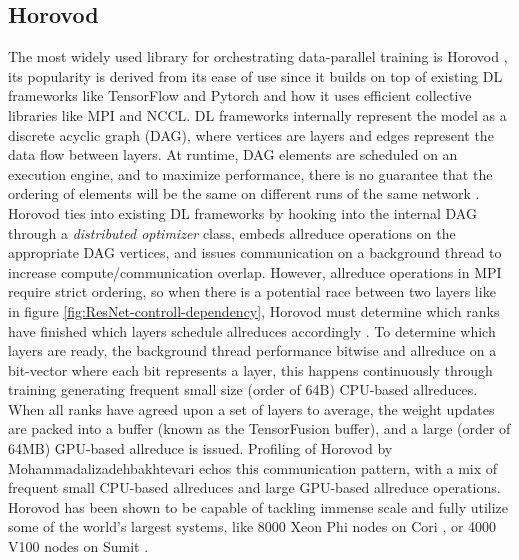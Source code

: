 \subsection{Horovod}\label{sec:CH3-horovod}
The most widely used library for orchestrating data-parallel training is Horovod \cite{Sergeev2018Horovod}, its popularity is derived from its ease of use since it builds on top of existing DL frameworks like TensorFlow and Pytorch and how it uses efficient collective libraries like MPI and NCCL.
DL frameworks internally represent the model as a discrete acyclic graph (DAG), where vertices are layers and edges represent the data flow between layers.
At runtime, DAG elements are scheduled on an execution engine, and to maximize performance, there is no guarantee that the ordering of elements will be the same on different runs of the same network \cite{Abadi2015TensorflowWhitepaper}. 
Horovod ties into existing DL frameworks by hooking into the internal DAG through a \textit{distributed optimizer} class, embeds allreduce operations on the appropriate DAG vertices, and issues communication on a background thread to increase compute/communication overlap.
However, allreduce operations in MPI require strict ordering, so when there is a potential race between two layers like in figure \ref{fig:ResNet-controll-dependency}, Horovod must determine which ranks have finished which layers schedule allreduces accordingly \cite{Kurth2019TFatScaleAnalysisOfHvdAndCPEML}.  
To determine which layers are ready, the background thread performance bitwise and allreduce on a bit-vector where each bit represents a layer, this happens continuously through training generating frequent small size (order of 64B) CPU-based allreduces.
When all ranks have agreed upon a set of layers to average, the weight updates are packed into a buffer (known as the TensorFusion buffer), and a large (order of 64MB) GPU-based allreduce is issued.
Profiling of Horovod by Mohammadalizadehbakhtevari \cite{Mohammadalizadehbakhtevari2021Thesis} echos this communication pattern, with a mix of frequent small CPU-based allreduces and large GPU-based allreduce operations.
Horovod has been shown to be capable of tackling immense scale and fully utilize some of the world's largest systems, like 8000 Xeon Phi nodes on Cori \cite{Mathuriya2019Cosmoflow}, or 4000 V100 nodes on Sumit \cite{Kurth2018ExascaleDLClimate}.


\clearpage